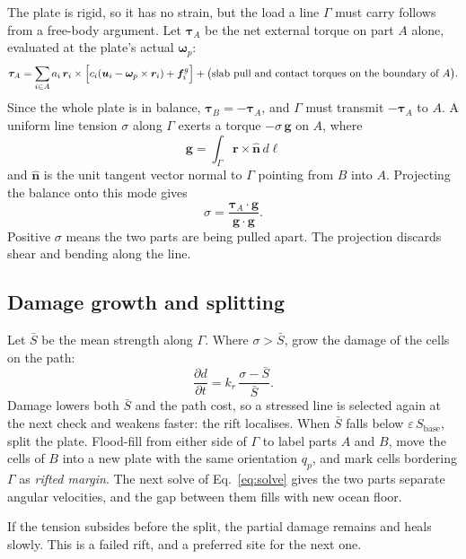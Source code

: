 \documentclass[11pt,a4paper]{article}
\newcommand{\vect}[1]{\bm{#1}}
\newcommand{\rr}{\vect{r}}
\newcommand{\om}{\vect{\omega}}
\newcommand{\uu}{\vect{u}}
\newcommand{\nn}{\hat{\vect{n}}}
\begin{document}
The plate is rigid, so it has no strain, but the load a line $\Gamma$ must
carry follows from a free-body argument. Let $\vect{\tau}_A$ be the net
external torque on part $A$ alone, evaluated at the plate's actual $\om_p$:
\begin{equation}
\vect{\tau}_A = \sum_{i \in A} a_i\,\rr_i \times
\Bigl[c_i(\uu_i - \om_p \times \rr_i) + \vect{f}^g_i\Bigr]
+ \bigl(\text{slab pull and contact torques on the boundary of } A\bigr).
\end{equation}
Since the whole plate is in balance, $\vect{\tau}_B = -\vect{\tau}_A$, and
$\Gamma$ must transmit $-\vect{\tau}_A$ to $A$. A uniform line tension
$\sigma$ along $\Gamma$ exerts a torque $-\sigma\,\vect{g}$ on $A$, where
\begin{equation}
\vect{g} = \int_\Gamma \rr \times \nn \, d\ell
\end{equation}
and $\nn$ is the unit tangent vector normal to $\Gamma$ pointing from $B$ into
$A$. Projecting the balance onto this mode gives
\begin{equation}
\sigma = \frac{\vect{\tau}_A \cdot \vect{g}}{\vect{g}\cdot\vect{g}} .
\end{equation}
Positive $\sigma$ means the two parts are being pulled apart. The projection
discards shear and bending along the line.

\subsection{Damage growth and splitting}

Let $\bar S$ be the mean strength along $\Gamma$. Where $\sigma > \bar S$,
grow the damage of the cells on the path:
\begin{equation}
\frac{\partial d}{\partial t} = k_r\,\frac{\sigma - \bar S}{\bar S} .
\end{equation}
Damage lowers both $\bar S$ and the path cost, so a stressed line is selected
again at the next check and weakens faster: the rift localises. When $\bar S$
falls below $\varepsilon\,S_\mathrm{base}$, split the plate. Flood-fill from
either side of $\Gamma$ to label parts $A$ and $B$, move the cells of $B$
into a new plate with the same orientation $q_p$, and mark cells bordering
$\Gamma$ as \emph{rifted margin}. The next solve of Eq.~\eqref{eq:solve}
gives the two parts separate angular velocities, and the gap between them
fills with new ocean floor.

If the tension subsides before the split, the partial damage remains and
heals slowly. This is a failed rift, and a preferred site for the next one.
\end{document}
